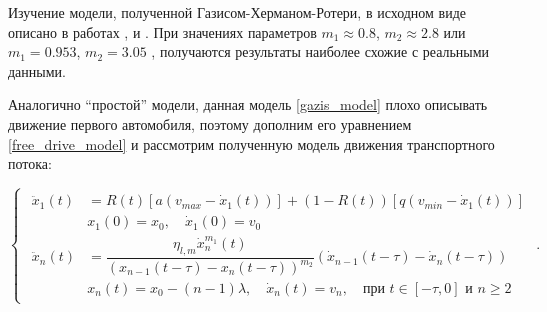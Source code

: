 \documentclass[12pt, a4paper]{extarticle}
\numberwithin{equation}{section}
\begin{document}
Изучение модели, полученной Газисом-Херманом-Ротери, в исходном виде описано в работах \cite{StudyingGazisModel_1},  \cite{StudyingGazisModel_2} и  \cite{StudyingGazisModel_3}. При значениях параметров $m_1 \approx 0.8$, $m_2 \approx 2.8$ \cite{StudyingGazisModel_1} или $m_1 = 0.953$, $m_2 = 3.05$ \cite{StudyingGazisModel_2}, \cite{StudyingGazisModel_3} получаются результаты наиболее схожие с реальными данными.

Аналогично ``простой'' модели, данная модель \eqref{gazis_model} плохо описывать движение первого автомобиля, поэтому дополним его уравнением \eqref{free_drive_model} и рассмотрим полученную модель движения транспортного потока:

\begin{equation} \label{full_gazis_model}
\begin{cases}
\begin{split}
\ddot{x}_1(t)& = R(t) \left[ a\left(v_{max}-\dot{x}_1(t) \right)\right] + (1-R(t)) \left[ q\left( v_{min} - \dot{x}_1(t)\right) \right] \\
&x_{1}(0)=x_0, \quad \dot{x}_{1}(0)=v_{0}\\
\ddot{x}_n(t)& = \dfrac{\eta_{l,m}\dot{x}_n^{m_1}(t)}{(x_{n-1}(t-\tau)-x_n(t-\tau))^{m_2}} (\dot{x}_{n-1}(t-\tau) - \dot{x}_{n}(t-\tau)) \\
&x_n(t)=x_0-(n-1)\lambda, \quad \dot{x}_n(t)=v_{n}, \quad \text{при } t \in [-\tau,0] \text{ и } n\geq2
\end{split}
\end{cases}.
\end{equation}
\end{document}
